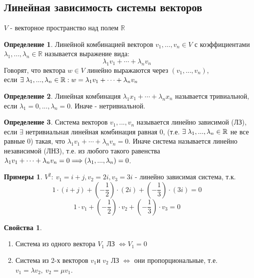 \documentclass[a4paper, 12pt]{article}
\newcommand{\R}{\mathbb R}
\newcommand\tab[1][.5cm]{\hspace*{#1}}
\theoremstyle{definition}
\newtheorem*{definition}{Определение}
\newtheorem*{example}{Примеры}
\newtheorem*{properties}{Свойства}
\begin{document}
  \subsection{Линейная зависимость системы векторов}
  $V$ - векторное пространство над полем $\R$
  \begin{definition}
    Линейной комбинацией векторов $v_1,...,v_n \in V$ с коэффициентами $\lambda_1,...,\lambda_n \in \R$ называется выражение вида: 
    $$\lambda_1 v_1 + \cdots + \lambda_n v_n$$ 
    Говорят, что вектора $w \in V$ линейно выражаются через $(v_1,...,v_n)$, \\ если $\exists\tab[0.1cm]\lambda_1,...,\lambda_n \in \R: w = \lambda_1 v_1 + \cdots + \lambda_n v_n$   
  \end{definition}
  \begin{definition}
    Линейная комбинация $\lambda_1 x_1 + \cdots + \lambda_n x_n$ называется тривиальной, если $\lambda_1 = 0,...,\lambda_n = 0$. Иначе - нетривиальной.
  \end{definition}
  \begin{definition}
    Система векторов $v_1,...,v_n$ называется линейно зависимой (ЛЗ), если $\exists$ нетривиальная линейная комбинация равная 0, (т.е. $\exists \tab[0.1cm]\lambda_1,...,\lambda_n \in \R$ не все равные 0) такая, что $\lambda_1 v_1 + \cdots + \lambda_n v_n = 0$. Иначе система называется линейно независимой (ЛНЗ), т.е. из любого такого равенства $\lambda_1 v_1 + \cdots + \lambda_n v_n = 0 \\ \Longrightarrow (\lambda_1,...,\lambda_n) = 0$.
  \end{definition}
  \begin{example}
    $V^2: \ v_1 = i + j, v_2 = 2i, v_3 = 3i$ - линейно зависимая система, т.к. $$1 \cdot (i + j) + (- \frac{1}{2}) \cdot (2i) + (-\frac{1}{3}) \cdot (3i) = 0$$ 
    $$1 \cdot v_1 + (-\frac{1}{2}) \cdot v_2 + (-\frac{1}{3}) \cdot v_3 = 0$$  
  \end{example}  
  \begin{properties} \end{properties} 
    \begin{enumerate}
      \item Система из одного вектора $V_1$ ЛЗ $\Longleftrightarrow V_1 = 0$  
      \item Система из 2-х векторов $v_1 \text{и } v_2$ ЛЗ $\Longleftrightarrow$ они пропорциональные, т.е. \\$v_1 = \lambda v_2, \  v_2 = \mu v_1$. 
    \end{enumerate}
\end{document}
